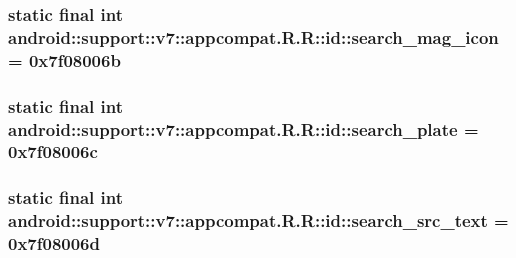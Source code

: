 \hypertarget{classandroid_1_1support_1_1v7_1_1appcompat_1_1_r_1_1id_e3e61c125c20c7080580b8843480c205}{
\subsubsection[{search\_\-mag\_\-icon}]{\setlength{\rightskip}{0pt plus 5cm}static final int android::support::v7::appcompat.R.R::id::search\_\-mag\_\-icon = 0x7f08006b}}
\label{classandroid_1_1support_1_1v7_1_1appcompat_1_1_r_1_1id_e3e61c125c20c7080580b8843480c205}


\hypertarget{classandroid_1_1support_1_1v7_1_1appcompat_1_1_r_1_1id_8e608182ce813b4ae8d0316015419579}{
\subsubsection[{search\_\-plate}]{\setlength{\rightskip}{0pt plus 5cm}static final int android::support::v7::appcompat.R.R::id::search\_\-plate = 0x7f08006c}}
\label{classandroid_1_1support_1_1v7_1_1appcompat_1_1_r_1_1id_8e608182ce813b4ae8d0316015419579}


\hypertarget{classandroid_1_1support_1_1v7_1_1appcompat_1_1_r_1_1id_22eec7652a1d5945f928d58a8044fbf3}{
\subsubsection[{search\_\-src\_\-text}]{\setlength{\rightskip}{0pt plus 5cm}static final int android::support::v7::appcompat.R.R::id::search\_\-src\_\-text = 0x7f08006d}}
\label{classandroid_1_1support_1_1v7_1_1appcompat_1_1_r_1_1id_22eec7652a1d5945f928d58a8044fbf3}



